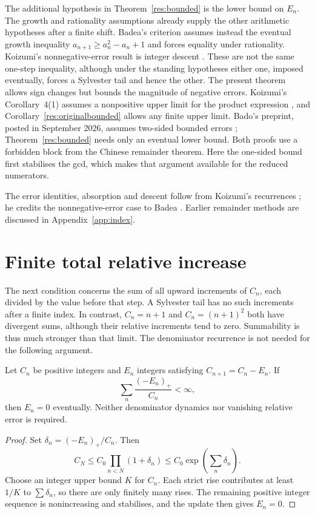 \documentclass[11pt]{article}
\begin{document}
The additional hypothesis in Theorem~\ref{res:bounded} is the lower bound
on $E_n$. The growth and rationality assumptions already supply the other
arithmetic hypotheses after a finite shift. Badea's criterion
\cite[Corollary~2.2, p.~316]{badea1993} assumes instead the eventual growth
inequality $a_{n+1}\ge a_n^2-a_n+1$ and forces equality under rationality.
Koizumi's nonnegative-error result is integer descent
\cite[Proposition~1(2), p.~14]{koizumi2025}. These are not the same
one-step inequality, although under the standing hypotheses either
one, imposed eventually, forces a Sylvester tail and hence the other.
The present theorem allows
sign changes but bounds the magnitude of negative errors. Koizumi's
Corollary~4(1) assumes a nonpositive upper limit for the product expression \cite[pp.~14--15]{koizumi2025}, and
Corollary~\ref{res:originalbounded} allows any finite upper limit. Bado's
preprint, posted in September 2026, assumes two-sided bounded errors
\cite[Theorem~5.1, p.~4]{bado2026}; Theorem~\ref{res:bounded} needs only an
eventual lower bound. Both proofs use a forbidden block from the Chinese
remainder theorem. Here the one-sided bound first stabilises the gcd,
which makes that argument available for the reduced numerators.

The error identities, absorption and descent follow from Koizumi's
recurrences \cite[Lemmas~2--4, pp.~10--12]{koizumi2025}; he credits the
nonnegative-error case to Badea \cite[Corollary~2.2, p.~316]{badea1993}.
Earlier remainder methods are discussed in Appendix~\ref{app:index}.

\section{Finite total relative increase}\label{sec:mass}
The next condition concerns the sum of all upward increments of $C_n$,
each divided by the value before that step. A Sylvester tail has no such
increments after a finite index. In contrast, $C_n=n+1$ and
$C_n=(n+1)^2$ both have divergent sums, although their relative increments
tend to zero. Summability is thus much stronger than that limit. The
denominator recurrence is not needed for the following argument.

\begin{theorem}\label{res:massscalar}\label{res:mass}
Let $C_n$ be positive integers and $E_n$ integers satisfying
$C_{n+1}=C_n-E_n$. If
\[
 \sum_n\frac{(-E_n)_+}{C_n}<\infty,
\]
then $E_n=0$ eventually. Neither denominator dynamics nor vanishing relative error is required.
\end{theorem}
\begin{proof}
Set $\delta_n=(-E_n)_+/C_n$. Then
\[
 C_N\le C_0\prod_{n<N}(1+\delta_n)
 \le C_0\exp\!\left(\sum_n\delta_n\right).
\]
Choose an integer upper bound $K$ for $C_n$. Each strict rise contributes
at least $1/K$ to $\sum\delta_n$, so there are only finitely many rises.
The remaining positive integer sequence is nonincreasing and stabilises,
and the update then gives $E_n=0$.
\end{proof}
\end{document}
